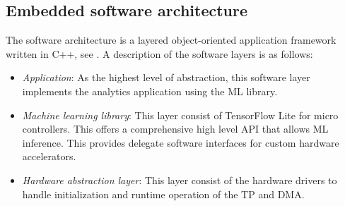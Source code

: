 \subsection{Embedded software architecture}
The software architecture is a layered object-oriented application framework written in C++, see . A description of the software layers is as follows:
\begin{itemize}
	\item \emph{Application}: As the highest level of abstraction, this software layer implements the analytics application using the ML library.
	\item \emph{Machine learning library}: This layer consist of TensorFlow Lite for micro controllers. This offers a comprehensive high level API that allows ML inference. This provides delegate software interfaces for custom hardware accelerators.
	\item \emph{Hardware abstraction layer}: This layer consist of the hardware drivers to handle initialization and runtime operation of the TP and DMA.
\end{itemize}